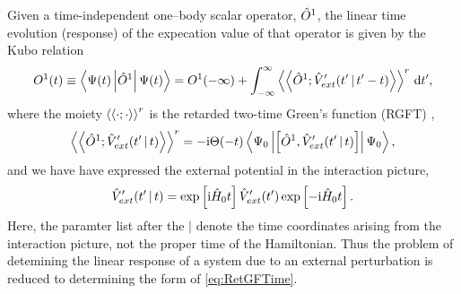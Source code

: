 Given a time-independent one--body scalar operator, $\hat{O}^1$, the linear time evolution (response) of the expecation value of that operator
is given by the Kubo relation 
\begin{equation}
\label{eq:Kubo}
O^1(t) \equiv \left\langle \Psi(t) \left\vert \hat{O}^1 \right\vert \Psi(t) \right\rangle = O^1(-\infty) + \int_{-\infty}^\infty \left \langle \left \langle \hat{O}^1; \hat{V}'_{ext}(t' \,\vert\, t'-t) \right\rangle \right\rangle^r \,\mathrm{d} t',
\end{equation}
where the moiety $\left \langle \left \langle \cdot; \cdot \right\rangle \right\rangle^r$ is the retarded two-time Green's function (RGFT) ,
\begin{equation}
  \label{eq:RetGFTime}
  \left \langle \left \langle \hat{O}^1; \hat{V}'_{ext}(t' \,\vert\, t) \right\rangle \right\rangle^r = -\mathrm i \Theta(-t) \left\langle \Psi_0 \left\vert \left[\hat{O}^1, \hat{V}'_{ext}(t' \,\vert\, t) \right] \right\vert \Psi_0 \right\rangle,
\end{equation}
and we have have expressed the external potential in the interaction picture,
\begin{equation}
  \label{eq:IntPicture}
\hat{V}'_{ext}(t' \,\vert\, t) = \exp\left[\mathrm i \hat{H}_0 t\right] \hat{V}'_{ext}(t') \exp\left[-\mathrm i \hat{H}_0 t\right].
\end{equation}
Here, the paramter list after the $\vert$ denote the time coordinates arising from the interaction picture, not the proper time of 
the Hamiltonian.
Thus the problem of detemining the linear response of a system due to an external perturbation is reduced to determining
the form of \cref{eq:RetGFTime}.

